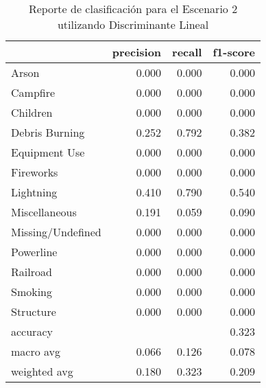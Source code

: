 \begin{table}
\centering
\caption{Reporte de clasificación para el Escenario 2 utilizando Discriminante Lineal}
\label{tab:DL_Escenario 2}
\begin{tabular}{lrrr}
\toprule
{} &  precision &  recall &  f1-score \\
\midrule
Arson             &      0.000 &   0.000 &     0.000 \\
Campfire          &      0.000 &   0.000 &     0.000 \\
Children          &      0.000 &   0.000 &     0.000 \\
Debris Burning    &      0.252 &   0.792 &     0.382 \\
Equipment Use     &      0.000 &   0.000 &     0.000 \\
Fireworks         &      0.000 &   0.000 &     0.000 \\
Lightning         &      0.410 &   0.790 &     0.540 \\
Miscellaneous     &      0.191 &   0.059 &     0.090 \\
Missing/Undefined &      0.000 &   0.000 &     0.000 \\
Powerline         &      0.000 &   0.000 &     0.000 \\
Railroad          &      0.000 &   0.000 &     0.000 \\
Smoking           &      0.000 &   0.000 &     0.000 \\
Structure         &      0.000 &   0.000 &     0.000 \\
accuracy          &            &         &     0.323 \\
macro avg         &      0.066 &   0.126 &     0.078 \\
weighted avg      &      0.180 &   0.323 &     0.209 \\
\bottomrule
\end{tabular}
\end{table}
